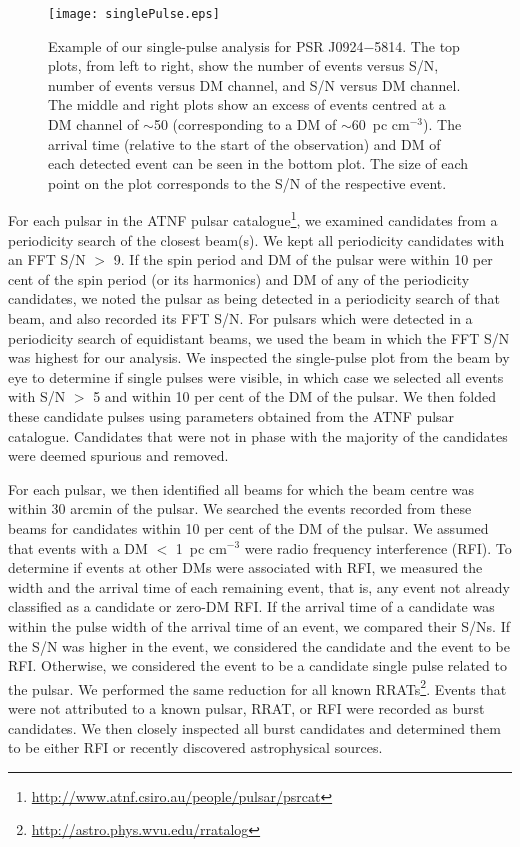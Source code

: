 \documentclass[fleqn,usenatbib]{mnras}
\begin{document}
\begin{figure*}
\centering
\texttt{[image: singlePulse.eps]}
\caption[Example of Single-Pulse Search Diagnostic Plot]{Example of our single-pulse analysis for 
PSR J0924$-$5814. The top plots, from left to right, show the number of events versus S/N, number 
of events versus DM channel, and S/N versus DM channel. The middle and right plots show an excess 
of events centred at a DM channel of $\sim$50 (corresponding to a DM of $\sim$60~pc 
cm$^{-3}$). The arrival time (relative to the start of the observation) and DM of each detected 
event can be seen in the bottom plot. The size of each point on the plot corresponds to the S/N of 
the respective event.}
\label{fig:single}
\end{figure*}

For each pulsar in the ATNF pulsar
catalogue\footnote{\url{http://www.atnf.csiro.au/people/pulsar/psrcat}}, we examined candidates from a periodicity search of the closest beam(s). We
kept all periodicity candidates with an FFT S/N $>$ 9. If the spin period and DM of the pulsar
were within 10 per cent of the spin period (or its harmonics) and DM of any of the periodicity candidates, we noted 
the pulsar as being detected in a periodicity search of that beam, and also recorded its FFT S/N. 
For pulsars which were detected in a periodicity search of equidistant beams, we used the beam in 
which the FFT S/N was highest for our analysis. We inspected the single-pulse plot from the beam 
by eye to determine if single pulses were visible, in which case we selected all events with S/N 
$>$ 5 and within 10 per cent of the DM of the pulsar. We then folded these candidate pulses using parameters obtained from the ATNF pulsar catalogue. Candidates that were not in phase with the majority of the candidates were deemed spurious and removed.

For each pulsar, we then identified all beams
for which the beam centre was within 30 arcmin of the pulsar. We searched the events recorded from these beams for candidates within 10 per cent of the DM of the pulsar. We assumed that
events with a DM $<$ 1~pc cm$^{-3}$ were radio frequency interference (RFI). To determine
if events at other DMs were associated with RFI, we measured the width and the arrival time
of each remaining event, that is, any event not already classified as a candidate or zero-DM RFI. If the arrival time of a candidate was within the pulse width of the arrival time of an event, we compared their S/Ns. If the S/N was higher in the event, we considered the candidate and the event to be RFI. Otherwise, we considered the event to be a candidate single pulse related to the pulsar. We performed the same reduction for all known RRATs\footnote{\url{http://astro.phys.wvu.edu/rratalog}}. Events that were not attributed to a known pulsar, RRAT, or RFI were recorded as burst candidates. We then closely inspected all burst candidates and determined them to be either RFI or recently discovered astrophysical sources.
\end{document}

